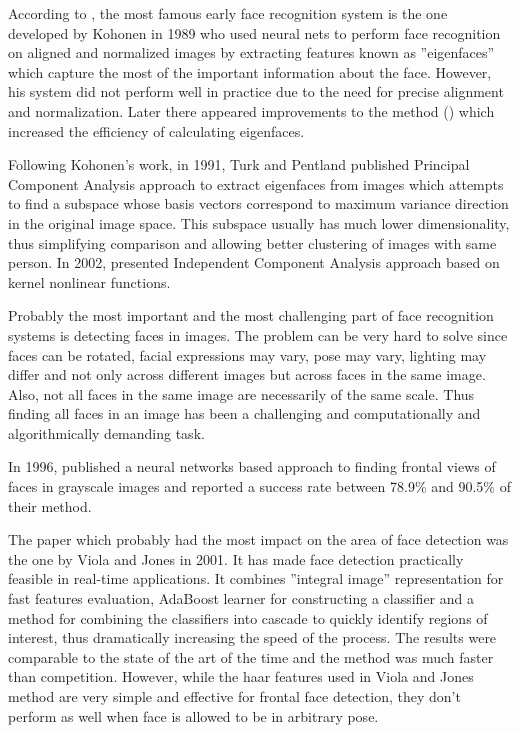 \documentclass[11pt, draftclsnofoot, onecolumn]{IEEEtran}
\begin{document}
According to \cite{MIT2000}, the most famous early face recognition system is the one developed by Kohonen in 1989 who used neural nets to perform face recognition on aligned and normalized images by extracting features known as ''eigenfaces'' which capture the most of the important information about the face. However, his system did not perform well in practice due to the need for precise alignment and normalization. Later there appeared improvements to the method (\cite{IEEE1990}) which increased the efficiency of calculating eigenfaces.

Following Kohonen's work, in 1991, Turk and Pentland \cite{MIT1991} published Principal Component Analysis approach to extract eigenfaces from images which attempts to find a subspace whose basis vectors correspond to maximum variance direction in the original image space. This subspace usually has much lower dimensionality, thus simplifying comparison and allowing better clustering of images with same person. In 2002, \cite{JMLR2002} presented Independent Component Analysis approach based on kernel nonlinear functions.

Probably the most important and the most challenging part of face recognition systems is detecting faces in images. The problem can be very hard to solve since faces can be rotated, facial expressions may vary, pose may vary, lighting may differ and not only across different images but across faces in the same image. Also, not all faces in the same image are necessarily of the same scale. Thus finding all faces in an image has been a challenging and computationally and algorithmically demanding task.

In 1996, \cite{CVPR1996} published a neural networks based approach to finding frontal views of faces in grayscale images and reported a success rate between 78.9\% and 90.5\% of their method.

The paper which probably had the most impact on the area of face detection was the one by Viola and Jones \cite{IWSCTV2001} in 2001. It has made face detection practically feasible in real-time applications. It combines ''integral image'' representation for fast features evaluation, AdaBoost learner for constructing a classifier and a method for combining the classifiers into cascade to quickly identify regions of interest, thus dramatically increasing the speed of the process. The results were comparable to the state of the art of the time and the method was much faster than competition. However, while the haar features used in Viola and Jones method are very simple and effective for frontal face detection, they don't perform as well when face is allowed to be in arbitrary pose.
\end{document}
